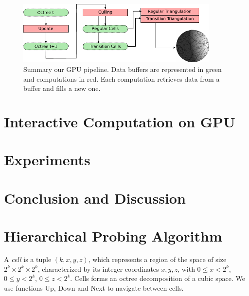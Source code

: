 \documentclass{llncs}
\begin{document}
\begin{figure}[!htbp]
  \centering
  \includegraphics[width=0.9\textwidth]{figs/pipeline}
  \caption{ Summary our GPU pipeline. Data buffers are
    represented in green and computations in red. Each computation
    retrieves data from a buffer and fills a new one. }
  \label{fig_pipeline} 
\end{figure}




\section{Interactive Computation on GPU}
\label{sec:inter-visu-gpu}






\section{Experiments}
\label{sec:experiments}



\section{Conclusion and Discussion}
\label{sec:discussion}



\appendix
\section{Hierarchical Probing Algorithm}



A {\em cell} is a tuple $(k,x,y,z)$, which represents a region of the space of size $2^k \times
2^k \times 2^k$, characterized by its integer coordinates $x,y,z$,
with $0 \le x < 2^k$, $0 \le y < 2^k$, $0 \le z < 2^k$. Cells forms an
octree decomposition of a cubic space. We use functions Up, Down and
Next to navigate between cells.
\end{document}
